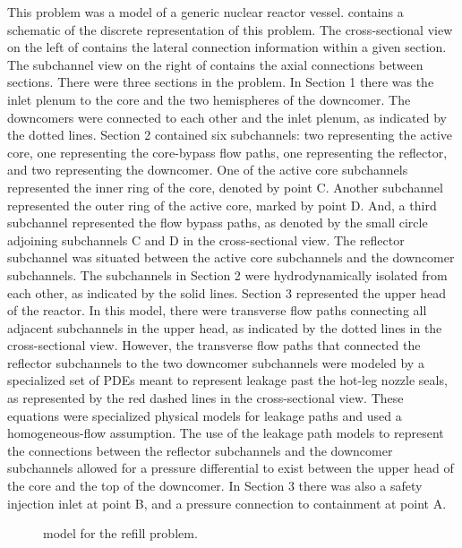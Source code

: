 This problem was a model of a generic nuclear reactor vessel.
 contains a schematic of the discrete representation of this problem.
The cross-sectional view on the left of  contains the lateral connection information within a given section.
The subchannel view on the right of  contains the axial connections between sections.
There were three sections in the problem.
In Section 1 there was the inlet plenum to the core and the two hemispheres of the downcomer.
The downcomers were connected to each other and the inlet plenum, as indicated by the dotted lines.
Section 2 contained six subchannels: two representing the active core, one representing the core-bypass flow paths, one representing the reflector, and two representing the downcomer.
One of the active core subchannels represented the inner ring of the core, denoted by point C.
Another subchannel represented the outer ring of the active core, marked by point D.
And, a third subchannel represented the flow bypass paths, as denoted by the small circle adjoining subchannels C and D in the cross-sectional view.
The reflector subchannel was situated between the active core subchannels and the downcomer subchannels.
The subchannels in Section 2 were hydrodynamically isolated from each other, as indicated by the solid lines.
Section 3 represented the upper head of the reactor.
In this model, there were transverse flow paths connecting all adjacent subchannels in the upper head, as indicated by the dotted lines in the cross-sectional view.
However, the transverse flow paths that connected the reflector subchannels to the two downcomer subchannels were modeled by a specialized set of PDEs meant to represent leakage past the hot-leg nozzle seals, as represented by the red dashed lines in the cross-sectional view.
These equations were specialized physical models for leakage paths and used a homogeneous-flow assumption.
The use of the leakage path models to represent the connections between the reflector subchannels and the downcomer subchannels allowed for a pressure differential to exist between the upper head of the core and the top of the downcomer.
In Section 3 there was also a safety injection inlet at point B, and a pressure connection to containment at point A.

\begin{figure}[h!tb]
\centering
\resizebox{\textwidth}{!}{}
\caption{\cobra{} model for the refill problem.}
\label{fig:refillModel}
\end{figure}

